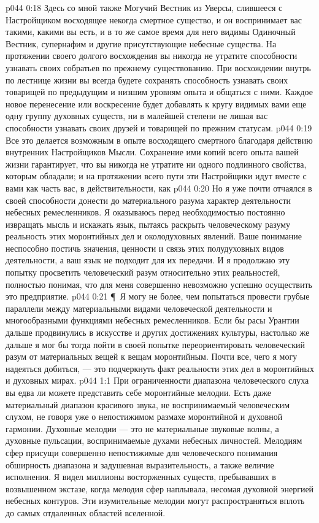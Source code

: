 \vs p044 0:18 Здесь со мной также Могучий Вестник из Уверсы, слившееся с Настройщиком восходящее некогда смертное существо, и он воспринимает вас такими, какими вы есть, и в то же самое время для него видимы Одиночный Вестник, супернафим и другие присутствующие небесные существа. На протяжении своего долгого восхождения вы никогда не утратите способности узнавать своих собратьев по прежнему существованию. При восхождении внутрь по лестнице жизни вы всегда будете сохранять способность узнавать своих товарищей по предыдущим и низшим уровням опыта и общаться с ними. Каждое новое перенесение или воскресение будет добавлять к кругу видимых вами еще одну группу духовных существ, ни в малейшей степени не лишая вас способности узнавать своих друзей и товарищей по прежним статусам.
\vs p044 0:19 Все это делается возможным в опыте восходящего смертного благодаря действию внутренних Настройщиков Мысли. Сохранение ими копий всего опыта вашей жизни гарантирует, что вы никогда не утратите ни одного подлинного свойства, которым обладали; и на протяжении всего пути эти Настройщики идут вместе с вами как часть вас, в действительности, как 
\vs p044 0:20 Но я уже почти отчаялся в своей способности донести до материального разума характер деятельности небесных ремесленников. Я оказываюсь перед необходимостью постоянно извращать мысль и искажать язык, пытаясь раскрыть человеческому разуму реальность этих моронтийных дел и околодуховных явлений. Ваше понимание неспособно постичь значения, ценности и связь этих полудуховных видов деятельности, а ваш язык не подходит для их передачи. И я продолжаю эту попытку просветить человеческий разум относительно этих реальностей, полностью понимая, что для меня совершенно невозможно успешно осуществить это предприятие.
\vs p044 0:21 \P\ Я могу не более, чем попытаться провести грубые параллели между материальными видами человеческой деятельности и многообразными функциями небесных ремесленников. Если бы расы Урантии дальше продвинулись в искусстве и других достижениях культуры, настолько же дальше я мог бы тогда пойти в своей попытке переориентировать человеческий разум от материальных вещей к вещам моронтийным. Почти все, чего я могу надеяться добиться, --- это подчеркнуть факт реальности этих дел в моронтийных и духовных мирах.
\vs p044 1:1 При ограниченности диапазона человеческого слуха вы едва ли можете представить себе моронтийные мелодии. Есть даже материальный диапазон красивого звука, не воспринимаемый человеческим слухом, не говоря уже о непостижимом размахе моронтийной и духовной гармонии. Духовные мелодии --- это не материальные звуковые волны, а духовные пульсации, воспринимаемые духами небесных личностей. Мелодиям сфер присущи совершенно непостижимые для человеческого понимания обширность диапазона и задушевная выразительность, а также величие исполнения. Я видел миллионы восторженных существ, пребывавших в возвышенном экстазе, когда мелодия сфер наплывала, несомая духовной энергией небесных контуров. Эти изумительные мелодии могут распространяться вплоть до самых отдаленных областей вселенной.
